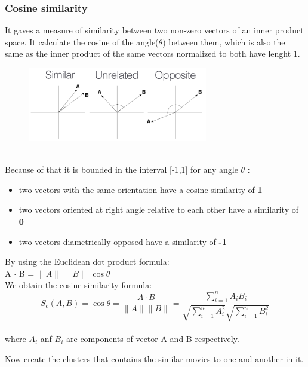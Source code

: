 \documentclass{article}
\begin{document}
\subsubsection{Cosine similarity}
It gaves a measure of similarity between two non-zero vectors of an inner product space. It calculate the cosine of the angle($\theta$) between them, which is also the same as the inner product of the same vectors normalized to both have lenght 1. \\
\begin{figure}[ht]
      \begin{center}
            \includegraphics[width=0.7\textwidth]{images/cosine.png}
      \end{center}
\end{figure}\\
Because of that it is bounded in the interval [-1,1] for any angle $\theta$ :
\begin{itemize}
      \item two vectors with the same orientation have a cosine similarity of \textbf{1}
      \item two vectors oriented at right angle relative to each other have a similarity of \textbf{0}
      \item two vectors diametrically opposed have a similarity of \textbf{-1}
\end{itemize}
By using the Euclidean dot product formula:\\
A $\cdot$ B = $\|A\|$ $\|B\|$ $\cos\theta$ \\
We obtain the cosine similarity formula:\\
\begin{equation}
      S_c(A,B) = \cos\theta = \frac{A \cdot B}{\|A\| \|B\|} = \frac{\sum_{i=1}^n A_i B_i}{\sqrt{\sum_{i=1}^n A_i^2}\sqrt{\sum_{i=1}^n B_i^2}}
\end{equation}\\
where $A_i$ anf $B_i$ are components of vector A and B respectively.


Now create the clusters that contains the similar movies to one and another in it. 
\end{document}
